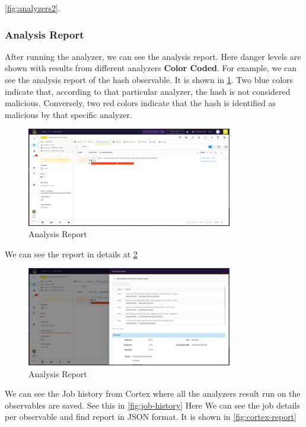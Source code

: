 \documentclass{article}
\begin{document}
\ref{fig:analyzers2}.


\subsubsection{Analysis Report}
After running the analyzer, we can see the analysis report. Here danger levels are shown with results from different analyzers \textbf{Color Coded}.
For example, we can see the analysis report of the hash observable.
It is shown in \ref{fig:analysis-report}. Two blue colors indicate that, according to that particular analyzer, the hash is not considered malicious. Conversely, two red colors indicate that the hash is identified as malicious by that specific analyzer.
\begin{figure}[H]
    \centering
    \includegraphics[width=0.8\textwidth]{img35.png}
    \caption{Analysis Report}
    \label{fig:analysis-report}
\end{figure}
We can see the report in details at \ref{fig:analysis-report2}

\begin{figure}[H]
    \centering
    \includegraphics[width=0.8\textwidth]{img34.png}
    \caption{Analysis Report}
    \label{fig:analysis-report2}
\end{figure}

We can see the Job history from Cortex where all the analyzers result run on the observables are saved. See this in \ref{fig:job-history}
Here We can see the job details per observable and find report in JSON format. It is shown in \ref{fig:cortex-report}
\end{document}
